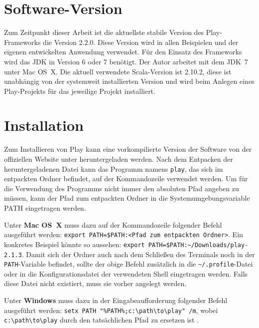 

\section{Software-Version} %
\label{sec:software_version}

Zum Zeitpunkt dieser Arbeit ist die aktuellste stabile Version des Play-Frameworks die Version 2.2.0.
Diese Version wird in allen Beispielen und der eigenen entwickelten Anwendung verwendet.
Für den Einsatz des Frameworks wird das JDK in Version 6 oder 7 benötigt.
Der Autor arbeitet mit dem JDK~7 unter Mac OS~X.
Die aktuell verwendete Scala-Version ist 2.10.2, diese ist unabhängig von der systemweit installierten Version und wird beim Anlegen eines Play-Projekts für das jeweilige Projekt installiert.



\section{Installation} %
\label{sec:installation}

Zum Installieren von Play kann eine vorkompilierte Version der Software von der offiziellen Website unter \cite{play_download} heruntergeladen werden.
Nach dem Entpacken der heruntergeladenen Datei kann das Programm namens \lstinline|play|, das sich im entpackten Ordner befindet, auf der Kommandozeile verwendet werden.
Um für die Verwendung des Programms nicht immer den absoluten Pfad angeben zu müssen, kann der Pfad zum entpackten Ordner in die Systemumgebungsvariable PATH eingetragen werden.

Unter \textbf{Mac OS~X} muss dazu auf der Kommandozeile folgender Befehl ausgeführt werden: \lstinline|export PATH=$PATH:<Pfad zum entpackten Ordner>|.
Ein konkretes Beispiel könnte so aussehen: \lstinline|export PATH=$PATH:~/Downloads/play-2.1.3|.
Damit sich der Ordner auch nach dem Schließen des Terminals noch in der \lstinline|PATH|-Variable befindet, sollte der obige Befehl zusätzlich in die \lstinline|~/.profile|-Datei oder in die Konfigurationsdatei der verwendeten Shell eingetragen werden.
Falls diese Datei nicht existiert, muss sie vorher angelegt werden.

Unter \textbf{Windows} muss dazu in der Eingabeaufforderung folgender Befehl ausgeführt werden: \lstinline|setx PATH "%PATH%;c:\path\to\play" /m|, wobei \lstinline|c:\path\to\play| durch den tatsächlichen Pfad zu ersetzen ist \cite[vgl.][S.~9]{play_for_scala}.

